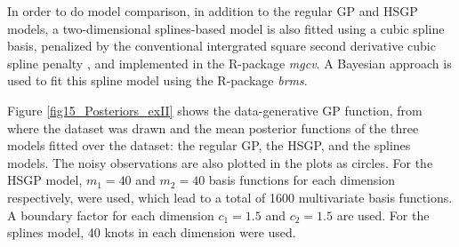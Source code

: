 \documentclass[]{interact}
\theoremstyle{plain}%
\theoremstyle{definition}
\theoremstyle{remark}
\begin{document}
In order to do model comparison, in addition to the regular GP and HSGP models, a two-dimensional splines-based model is also fitted using a cubic spline basis, penalized by the conventional intergrated square second derivative cubic spline penalty \citep{wood2017generalized}, and implemented in the R-package \textit{mgcv}. A Bayesian approach is used to fit this spline model using the R-package \textit{brms}.

Figure \ref{fig15_Posteriors_exII} shows the data-generative GP function, from where the dataset was drawn and the mean posterior functions of the three models fitted over the dataset: the regular GP, the HSGP, and the splines models. The noisy observations are also plotted in the plots as circles. For the HSGP model, $m_1=40$ and $m_2=40$ basis functions for each dimension respectively, were used, which lead to a total of 1600 multivariate basis functions. A boundary factor for each dimension $c_1=1.5$ and $c_2=1.5$ are used. For the splines model, 40 knots in each dimension were used.
\end{document}
